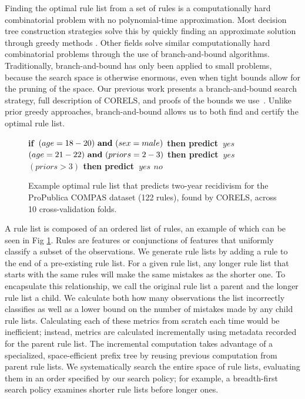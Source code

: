 \documentclass[format=sigconf]{acmart}
\def\bif{\bf if~}
\def\belif{{\bf else if~}}
\def\bthen{{\bf then predict~}}
\def\belse{{\bf else predict~}}
\def\band{{\bf ~and~}}
\begin{document}
Finding the optimal rule list from a set of rules is a computationally hard combinatorial problem with no polynomial-time approximation.
Most decision tree construction strategies solve this by quickly finding an approximate solution through greedy  methods \citep{BreimanFrOlSt84, Quinlan93}.
Other fields solve similar computationally hard combinatorial problems through the use of branch-and-bound algorithms\citep{Clausen99}.
Traditionally, branch-and-bound has only been applied to small problems, because the search space is otherwise enormous, even when tight bounds allow for the pruning of the space.
Our previous work presents a branch-and-bound search strategy, full description of CORELS, and proofs of the bounds we use~\cite{AngelinoLaAlSeRu17, ErtekinRu17}.
Unlike prior greedy approaches, branch-and-bound allows us to both find and certify the optimal rule list.

\begin{figure}[b!]
\vspace{-1mm}
\begin{algorithmic}
\State \bif $(age = 18-20) \band (sex = male)$ \bthen $yes$
\State \belif $(age = 21-22) \band (priors = 2-3)$ \bthen $yes$
\State \belif $(priors > 3)$ \bthen $yes$
\State \belse $no$
\end{algorithmic}
\vspace{-2mm}
\caption{Example optimal rule list that predicts two-year recidivism for the ProPublica COMPAS dataset (122 rules), found by CORELS, across 10 cross-validation folds.
%
}
\label{fig:recidivism}
\end{figure}

A rule list is composed of an ordered list of rules, an example of which can be seen in Fig \ref{fig:recidivism}.
Rules are features or conjunctions of features that uniformly classify a subset of the observations.
We generate rule lists by adding a rule to the end of a pre-existing rule list.
For a given rule list, any longer rule list that starts with the same rules will make the same mistakes as the shorter one.
To encapsulate this relationship, we call the original rule list a parent and the longer rule list a child.
We calculate both how many observations the list incorrectly classifies as well as a lower bound on the number of mistakes made by any child rule lists.
Calculating each of these metrics from scratch each time would be inefficient; instead, metrics are calculated incrementally using metadata recorded for the parent rule list.
The incremental computation takes advantage of a specialized, space-efficient prefix tree by reusing previous computation from parent rule lists.
We systematically search the entire space of rule lists, evaluating them in an order specified by our search policy; for example, a breadth-first search policy examines shorter rule lists before longer ones.
\end{document}
